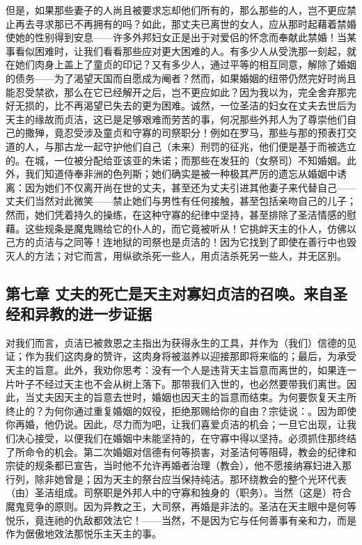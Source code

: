 但是，如果那些妻子的人尚且被要求忘却他们所有的，那么那些的人，岂不更应禁止再去寻求那已不再拥有的吗？如此，那丈夫已离世的女人，应从那时起藉着禁婚使她的性别得到安息——许多外邦妇女正是出于对爱侣的怀念而奉献此禁婚！当某事看似困难时，让我们看看那些应对更大困难的人。有多少人从受洗那一刻起，就在她们肉身上盖上了童贞的印记？又有多少人，通过平等的相互同意，解除了婚姻的债务——为了渴望天国而自愿成为阉者？然而，如果婚姻的纽带仍然完好时尚且能忍受禁欲，那么在它已经解开之后，岂不更应如此？因为我以为，完全舍弃那完好无损的，比不再渴望已失去的更为困难。诚然，一位圣洁的妇女在丈夫去世后为天主的缘故而贞洁，这已是足够艰难而劳苦的事，何况那些外邦人为了尊崇他们自己的撒殚，竟忍受涉及童贞和守寡的司祭职分！例如在罗马，那些与那的预表打交道的人，与那古龙一起守护他们自己（未来）刑罚的征兆，他们便是基于而被选立的。在城，一位被分配给亚该亚的朱诺；而那些在发狂的（女祭司）不知婚姻。此外，我们知道侍奉非洲的色列斯；她们确实是被一种极其严厉的遗忘从婚姻中诱离：因为她们不仅离开尚在世的丈夫，甚至还为丈夫引进其他妻子来代替自己——丈夫们当然对此微笑——禁止她们与男性有任何接触，甚至包括亲吻自己的儿子；然而，她们凭着持久的操练，在这种守寡的纪律中坚持，甚至排除了圣洁情感的慰藉。这些规条是魔鬼赐给它的仆人的，而它竟被听从！它挑衅天主的仆人，仿佛以己方的贞洁与之同等！连地狱的司祭也是贞洁的！因为它找到了即使在善行中也毁灭人的方法；对它而言，用纵欲杀死一些人，用贞洁杀死另一些人，并无区别。\par


\subsection{第七章 丈夫的死亡是天主对寡妇贞洁的召唤。来自圣经和异教的进一步证据}

对我们而言，贞洁已被救恩之主指出为获得永生的工具，并作为（我们）信德的见证；作为我们这肉身的赞许，这肉身将被滋养以迎接那即将来临的；最后，为承受天主的旨意。此外，我劝你思考：没有一个人是违背天主旨意而离世的，如果连一片叶子不经过天主也不会从树上落下。那带我们入世的，也必然要带我们离世。因此，当丈夫因天主的旨意去世时，婚姻也因天主的旨意而结束。为何要恢复天主所终止的？为何你通过重复婚姻的奴役，拒绝那赐给你的自由？宗徒说：。因为即使你再婚，他仍说。因此，尽力而为吧，让我们喜爱贞洁的机会；一旦它出现，让我们决心接受，以便我们在婚姻中未能坚持的，在守寡中得以坚持。必须抓住那终结了所命令的机会。第二次婚姻对信德有何等损害，对圣洁何等阻碍，教会的纪律和宗徒的规条都已宣告，当时他不允许再婚者治理（教会），他不愿接纳寡妇进入那行列，除非她曾是；因为天主的祭台应当保持纯洁。那环绕教会的整个光环代表（由）圣洁组成。司祭职是外邦人中的守寡和独身的（职务）。当然（这是）符合魔鬼竞争的原则。因为异教之王，大司祭，再婚是非法的。圣洁在天主眼中是何等悦乐，竟连祂的仇敌都效法它！——当然，不是因为它与任何善事有亲和力，而是作为倨傲地效法那悦乐主天主的事。\par

